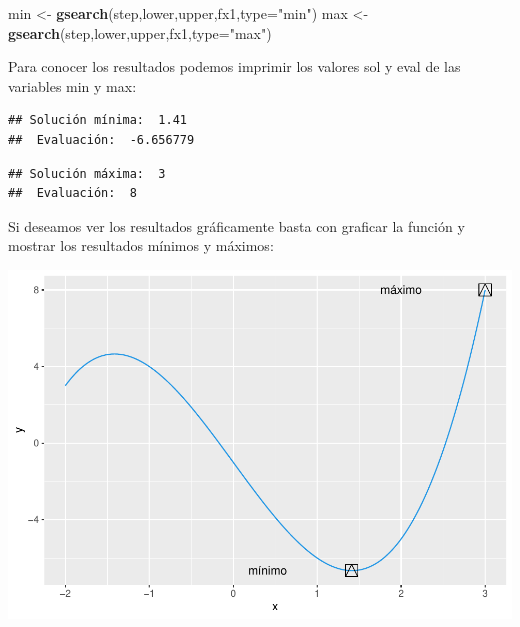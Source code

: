 \documentclass[11pt,]{article}
\newenvironment{Shaded}{\begin{snugshade}}{\end{snugshade}}
\newcommand{\DataTypeTok}[1]{\textcolor[rgb]{0.13,0.29,0.53}{#1}}
\newcommand{\KeywordTok}[1]{\textcolor[rgb]{0.13,0.29,0.53}{\textbf{#1}}}
\newcommand{\NormalTok}[1]{#1}
\newcommand{\StringTok}[1]{\textcolor[rgb]{0.31,0.60,0.02}{#1}}
\begin{document}
\begin{Shaded}
\begin{Highlighting}[]
\NormalTok{min <-}\StringTok{ }\KeywordTok{gsearch}\NormalTok{(step,lower,upper,fx1,}\DataTypeTok{type=}\StringTok{"min"}\NormalTok{)}
\NormalTok{max <-}\StringTok{ }\KeywordTok{gsearch}\NormalTok{(step,lower,upper,fx1,}\DataTypeTok{type=}\StringTok{"max"}\NormalTok{)}
\end{Highlighting}
\end{Shaded}

Para conocer los resultados podemos imprimir los valores sol y eval de
las variables min y max:

\begin{verbatim}
## Solución mínima:  1.41 
##  Evaluación:  -6.656779
\end{verbatim}

\begin{verbatim}
## Solución máxima:  3 
##  Evaluación:  8
\end{verbatim}

Si deseamos ver los resultados gráficamente basta con graficar la
función y mostrar los resultados mínimos y máximos:

\includegraphics{gridSearch_files/figure-latex/unnamed-chunk-4-1.pdf}

\newpage
\singlespacing 
\end{document}

